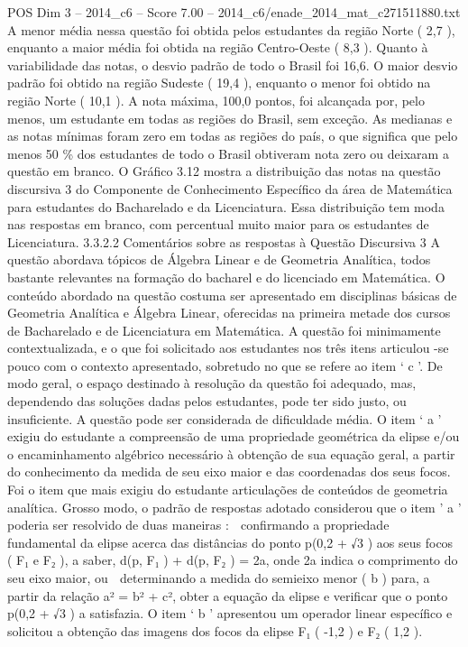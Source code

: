 \begin{textsample}{POS Dim 3 – 2014\_c6 – Score 7.00 – 2014\_c6/enade\_2014\_mat\_c271511880.txt}
A menor média nessa questão foi obtida pelos estudantes da região Norte ( 2,7 ), enquanto a maior média foi obtida na região Centro-Oeste ( 8,3 ).
Quanto à variabilidade das notas, o desvio padrão de todo o Brasil foi 16,6.
O maior desvio padrão foi obtido na região Sudeste ( 19,4 ), enquanto o menor foi obtido na região Norte ( 10,1 ).
A nota máxima, 100,0 pontos, foi alcançada por, pelo menos, um estudante em todas as regiões do Brasil, sem exceção.
As medianas e as notas mínimas foram zero em todas as regiões do país, o que significa que pelo menos 50 \% dos estudantes de todo o Brasil obtiveram nota zero ou deixaram a questão em branco.
O Gráfico 3.12 mostra a distribuição das notas na questão discursiva 3 do Componente de Conhecimento Específico da área de Matemática para estudantes do Bacharelado e da Licenciatura.
Essa distribuição tem moda nas respostas em branco, com percentual muito maior para os estudantes de Licenciatura. 3.3.2.2 Comentários sobre as respostas à Questão Discursiva 3 A questão abordava tópicos de Álgebra Linear e de Geometria Analítica, todos bastante relevantes na formação do bacharel e do licenciado em Matemática.
O conteúdo abordado na questão costuma ser apresentado em disciplinas básicas de Geometria Analítica e Álgebra Linear, oferecidas na primeira metade dos cursos de Bacharelado e de Licenciatura em Matemática.
A questão foi minimamente contextualizada, e o que foi solicitado aos estudantes nos três itens articulou -se pouco com o contexto apresentado, sobretudo no que se refere ao item ‘ c ’.
De modo geral, o espaço destinado à resolução da questão foi adequado, mas, dependendo das soluções dadas pelos estudantes, pode ter sido justo, ou insuficiente.
A questão pode ser considerada de dificuldade média.
O item ‘ a ’ exigiu do estudante a compreensão de uma propriedade geométrica da elipse e/ou o encaminhamento algébrico necessário à obtenção de sua equação geral, a partir do conhecimento da medida de seu eixo maior e das coordenadas dos seus focos.
Foi o item que mais exigiu do estudante articulações de conteúdos de geometria analítica.
Grosso modo, o padrão de respostas adotado considerou que o item ’ a ’ poderia ser resolvido de duas maneiras :  confirmando a propriedade fundamental da elipse acerca das distâncias do ponto p(0,2 + √3 ) aos seus focos ( F₁ e F₂ ), a saber, d(p, F₁ ) + d(p, F₂ ) = 2a, onde 2a indica o comprimento do seu eixo maior, ou  determinando a medida do semieixo menor ( b ) para, a partir da relação a² = b² + c², obter a equação da elipse e verificar que o ponto p(0,2 + √3 ) a satisfazia.
O item ‘ b ’ apresentou um operador linear específico e solicitou a obtenção das imagens dos focos da elipse F₁ ( -1,2 ) e F₂ ( 1,2 ).

\end{textsample}
